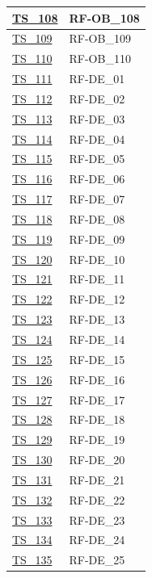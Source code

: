 \begin{longtable}{|
    >{\raggedright\arraybackslash}p{} |
    >{\centering\arraybackslash}p{} |
    }
    \hyperlink{ts-108}{TS\_108} & RF-OB\_108 \\ \hline
    \hyperlink{ts-109}{TS\_109} & RF-OB\_109 \\ \hline
    \hyperlink{ts-110}{TS\_110} & RF-OB\_110 \\ \hline
    \hyperlink{ts-111}{TS\_111} & RF-DE\_01 \\ \hline
    \hyperlink{ts-112}{TS\_112} & RF-DE\_02 \\ \hline
    \hyperlink{ts-113}{TS\_113} & RF-DE\_03 \\ \hline
    \hyperlink{ts-114}{TS\_114} & RF-DE\_04 \\ \hline
    \hyperlink{ts-115}{TS\_115} & RF-DE\_05 \\ \hline
    \hyperlink{ts-116}{TS\_116} & RF-DE\_06 \\ \hline
    \hyperlink{ts-117}{TS\_117} & RF-DE\_07 \\ \hline
    \hyperlink{ts-118}{TS\_118} & RF-DE\_08 \\ \hline
    \hyperlink{ts-119}{TS\_119} & RF-DE\_09 \\ \hline
    \hyperlink{ts-120}{TS\_120} & RF-DE\_10 \\ \hline
    \hyperlink{ts-121}{TS\_121} & RF-DE\_11 \\ \hline
    \hyperlink{ts-122}{TS\_122} & RF-DE\_12 \\ \hline
    \hyperlink{ts-123}{TS\_123} & RF-DE\_13 \\ \hline
    \hyperlink{ts-124}{TS\_124} & RF-DE\_14 \\ \hline
    \hyperlink{ts-125}{TS\_125} & RF-DE\_15 \\ \hline
    \hyperlink{ts-126}{TS\_126} & RF-DE\_16 \\ \hline
    \hyperlink{ts-127}{TS\_127} & RF-DE\_17 \\ \hline
    \hyperlink{ts-128}{TS\_128} & RF-DE\_18 \\ \hline
    \hyperlink{ts-129}{TS\_129} & RF-DE\_19 \\ \hline
    \hyperlink{ts-130}{TS\_130} & RF-DE\_20 \\ \hline
    \hyperlink{ts-131}{TS\_131} & RF-DE\_21 \\ \hline
    \hyperlink{ts-132}{TS\_132} & RF-DE\_22 \\ \hline
    \hyperlink{ts-133}{TS\_133} & RF-DE\_23 \\ \hline
    \hyperlink{ts-134}{TS\_134} & RF-DE\_24 \\ \hline
    \hyperlink{ts-135}{TS\_135} & RF-DE\_25 \\ \hline

\end{longtable}
